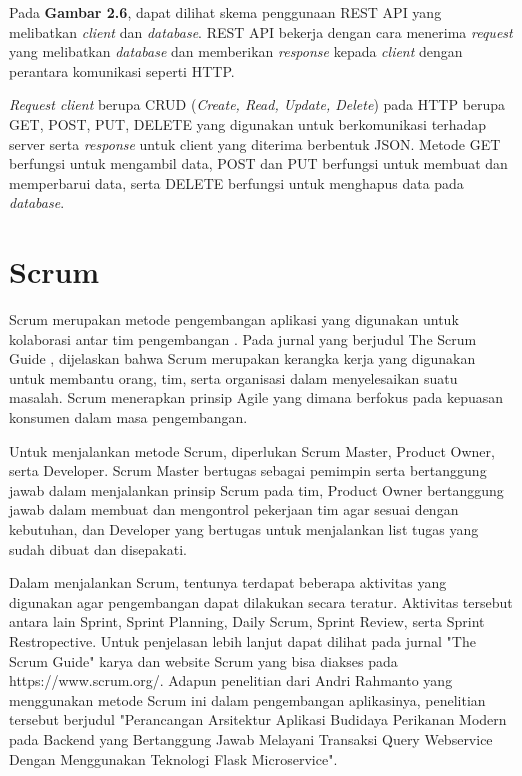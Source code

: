 \begin{spacing}{1.5}
Pada \textbf{Gambar 2.6}, dapat dilihat skema penggunaan REST API yang melibatkan \textit{client} dan \textit{database}. REST API bekerja dengan cara menerima \textit{request} yang melibatkan \textit{database} dan memberikan \textit{response} kepada \textit{client} dengan perantara komunikasi seperti HTTP.

\textit{Request client} berupa CRUD (\textit{Create, Read, Update, Delete}) pada HTTP berupa GET, POST, PUT, DELETE yang digunakan untuk berkomunikasi terhadap server serta \textit{response} untuk client yang diterima berbentuk JSON. Metode GET berfungsi untuk mengambil data, POST dan PUT berfungsi untuk membuat dan memperbarui data, serta DELETE berfungsi untuk menghapus data pada \textit{database}.

\section{Scrum}

Scrum merupakan metode pengembangan aplikasi yang digunakan untuk kolaborasi antar tim pengembangan \citep{scrumweb}. Pada jurnal yang berjudul The Scrum Guide \citep{scrum}, dijelaskan bahwa Scrum merupakan kerangka kerja yang digunakan untuk membantu orang, tim, serta organisasi dalam menyelesaikan suatu masalah. Scrum menerapkan prinsip Agile yang dimana berfokus pada kepuasan konsumen dalam masa pengembangan.

Untuk menjalankan metode Scrum, diperlukan Scrum Master, Product Owner, serta Developer. Scrum Master bertugas sebagai pemimpin serta bertanggung jawab dalam menjalankan prinsip Scrum pada tim, Product Owner bertanggung jawab dalam membuat dan mengontrol pekerjaan tim agar sesuai dengan kebutuhan, dan Developer yang bertugas untuk menjalankan list tugas yang sudah dibuat dan disepakati.

Dalam menjalankan Scrum, tentunya terdapat beberapa aktivitas yang digunakan agar pengembangan dapat dilakukan secara teratur. Aktivitas tersebut antara lain Sprint, Sprint Planning, Daily Scrum, Sprint Review, serta Sprint Restropective. Untuk penjelasan lebih lanjut dapat dilihat pada jurnal "The Scrum Guide" karya \citep{scrum} dan website Scrum yang bisa diakses pada https://www.scrum.org/. Adapun penelitian dari Andri Rahmanto yang menggunakan metode Scrum ini dalam pengembangan aplikasinya, penelitian tersebut berjudul "Perancangan Arsitektur Aplikasi Budidaya Perikanan Modern pada Backend yang Bertanggung Jawab Melayani Transaksi Query Webservice Dengan Menggunakan Teknologi Flask Microservice".


\end{spacing}

